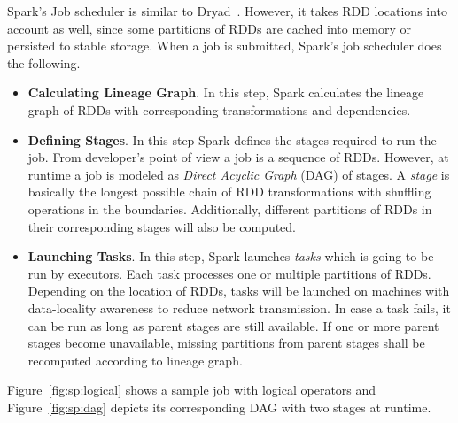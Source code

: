 Spark's Job scheduler is similar to Dryad~\cite{Isard:2007}. However, it takes RDD locations into account as well, since some partitions of RDDs are cached into memory or persisted to stable storage. When a job is submitted, Spark's job scheduler does the following.
\begin{itemize}
    \item \textbf{Calculating Lineage Graph}. In this step, Spark calculates the lineage graph of RDDs with corresponding transformations and dependencies.
    \item \textbf{Defining Stages}. In this step Spark defines the stages required to run the job. From developer's point of view a job is a sequence of RDDs. However, at runtime a job is modeled as \emph{Direct Acyclic Graph} (DAG) of stages. A \emph{stage} is basically the longest possible chain of RDD transformations with shuffling operations in the boundaries. Additionally, different partitions of RDDs in their corresponding stages will also be computed. 
    \item \textbf{Launching Tasks}. In this step, Spark launches \emph{tasks} which is going to be run by executors. Each task processes one or multiple partitions of RDDs. Depending on the location of RDDs, tasks will be launched on machines with data-locality awareness to reduce network transmission. In case a task fails, it can be run as long as parent stages are still available. If one or more parent stages become unavailable, missing partitions from parent stages shall be recomputed according to lineage graph.
\end{itemize}
Figure~\ref{fig:sp:logical} shows a sample job with logical operators and Figure~\ref{fig:sp:dag} depicts its corresponding DAG with two stages at runtime.
